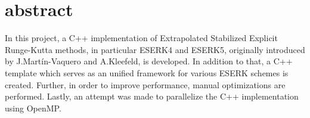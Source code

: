 \section{abstract}
In this project, a C++ implementation of Extrapolated Stabilized Explicit Runge-Kutta methods, in particular ESERK4 and ESERK5, originally introduced by J.Mart\'{i}n-Vaquero and A.Kleefeld, is developed. In addition to that, a C++ template which serves as an unified framework for various ESERK schemes is created. Further, in order to improve performance, manual optimizations are performed. Lastly, an attempt was made to parallelize the C++ implementation using OpenMP.       